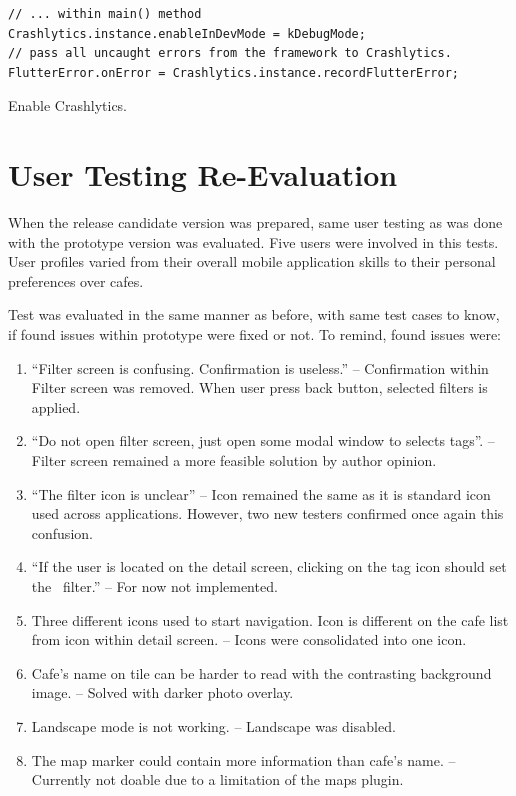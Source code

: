 \begin{listing}[h!]
\begin{verbatim}
// ... within main() method
Crashlytics.instance.enableInDevMode = kDebugMode;
// pass all uncaught errors from the framework to Crashlytics.
FlutterError.onError = Crashlytics.instance.recordFlutterError;
\end{verbatim}
\caption{Enable Crashlytics.}
\label{listing:ct-crashlytics-enable}
\end{listing}

\section{User Testing Re-Evaluation}
When the release candidate version was prepared, same user testing as was done with the prototype version was evaluated. Five users were involved in this tests. User profiles varied from their overall mobile application skills to their personal preferences over cafes. 

Test was evaluated in the same manner as before, with same test cases to know, if found issues within prototype were fixed or not. To remind, found issues were:

\begin{enumerate}
    \item ``Filter screen is confusing. Confirmation is useless.'' -- Confirmation within Filter screen was removed. When user press back button, selected filters is applied.
    \item ``Do not open filter screen, just open some modal window to selects tags''. -- Filter screen remained a more feasible solution by author opinion.
    \item ``The filter icon is unclear'' -- Icon remained the same as it is standard icon used across applications. However, two new testers confirmed once again this confusion. 
    \item ``If the user is located on the detail screen, clicking on the tag icon should set the~ filter.'' -- For now not implemented. 
    \item Three different icons used to start navigation. Icon is different on the cafe list from icon within detail screen. -- Icons were consolidated into one icon. 
    \item Cafe's name on tile can be harder to read with the contrasting background image. -- Solved with darker photo overlay. 
    \item Landscape mode is not working. -- Landscape was disabled. 
    \item The map marker could contain more information than cafe's name. -- Currently not doable due to a limitation of the maps plugin.
\end{enumerate}

